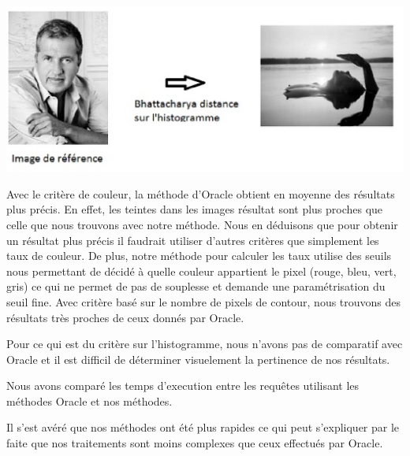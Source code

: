 \begin{center}
\includegraphics[scale=0.55]{resultatHist.eps}
\hspace{5pt}
\end{center}

Avec le critère de couleur, la méthode d'Oracle obtient en moyenne des résultats plus précis. En effet, les teintes dans les images résultat sont plus proches que celle que nous trouvons avec notre méthode. Nous en déduisons que pour obtenir un résultat plus précis il faudrait utiliser d'autres critères que simplement les taux de couleur. De plus, notre méthode pour calculer les taux utilise des seuils nous permettant de décidé à quelle couleur appartient le pixel (rouge, bleu, vert, gris) ce qui ne permet de pas de souplesse et demande une paramétrisation du seuil fine.
Avec critère basé sur le nombre de pixels de contour, nous trouvons des résultats très proches de ceux donnés par Oracle.

Pour ce qui est du critère sur l'histogramme, nous n'avons pas de comparatif avec Oracle et il est difficil de déterminer visuelement la pertinence de nos résultats.


Nous avons comparé les temps d'execution entre les requêtes utilisant les méthodes Oracle et nos méthodes.

\begin{table}[ht]
\centering
{}
\caption{Tableau de comparaison des temps d'execution} 
\end{table} 

Il s'est avéré que nos méthodes ont été plus rapides ce qui peut s'expliquer par le faite que nos traitements sont moins complexes que ceux effectués par Oracle.